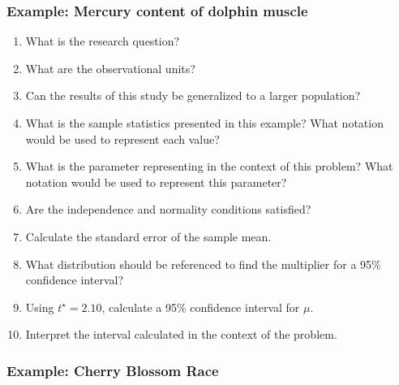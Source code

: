\documentclass[
]{report}
\newcommand{\rgs}{\vspace{12pt}} %
\begin{document}
\hypertarget{example-mercury-content-of-dolphin-muscle}{%
\subsubsection*{Example: Mercury content of dolphin muscle}\label{example-mercury-content-of-dolphin-muscle}}

\begin{enumerate}
\def\labelenumi{\arabic{enumi}.}
\item
  What is the research question?
  \rgs 
\item
  What are the observational units?
  \rgs 
\item
  Can the results of this study be generalized to a larger population?
  \rgs 
\item
  What is the sample statistics presented in this example? What notation would be used to represent each value?
  \rgs 
\item
  What is the parameter representing in the context of this problem? What notation would be used to represent this parameter?
  \rgs 
  \rgs 
\item
  Are the independence and normality conditions satisfied?
  \rgs 
  \rgs 
\item
  Calculate the standard error of the sample mean.
  \rgs 
\item
  What distribution should be referenced to find the multiplier for a 95\% confidence interval?
  \rgs 
\item
  Using \(t^\star=2.10\), calculate a 95\% confidence interval for \(\mu\).
  \rgs 
\item
  Interpret the interval calculated in the context of the problem.
  \rgs 
  \rgs 
\end{enumerate}

\hypertarget{example-cherry-blossom-race}{%
\subsubsection*{Example: Cherry Blossom Race}\label{example-cherry-blossom-race}}
\end{document}
